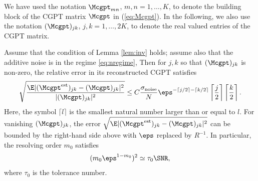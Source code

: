 We have used the notation $\Mcgpt_{mn}$, $m,n=1, \ldots, K$, to
denote the building block of the CGPT matrix $\Mcgpt$ in
(\ref{eq:Mcgpt}). In the following, we also use the notation
$(\Mcgpt)_{jk}$, $j,k=1, \ldots, 2K$, to denote the real valued
entries of the CGPT matrix.

\begin{theorem} Assume that the condition of Lemma \ref{lem:inv} holds; assume also that the additive noise is in the regime \eqref{eq:nregime}, Then for $j,k$ so that $(\Mcgpt)_{jk}$ is non-zero, the relative error in its reconstructed CGPT satisfies
\begin{equation}
\sqrt{\frac{\E |(\Mcgpt^{\mathrm{est}})_{jk} -
(\Mcgpt)_{jk}|^2}{|(\Mcgpt)_{jk}|^2}} \le C
\frac{\sigma_{\mathrm{noise}}}{N} \eps^{-\lceil j/2 \rceil -
\lceil k/2 \rceil} \left\lceil \frac{j}{2} \right\rceil
\left\lceil \frac{k}{2} \right\rceil. \label{eq:rerrM}
\end{equation}
Here, the symbol $\lceil l \rceil$ is the smallest natural number
larger than or equal to $l$. For vanishing $(\Mcgpt)_{jk}$, the
error $\sqrt{\E  |(\Mcgpt^{\mathrm{est}})_{jk} -
(\Mcgpt)_{jk}|^2}$ can be bounded by the right-hand side above
with $\eps$ replaced by $R^{-1}$. In particular, the resolving
order $m_0$ satisfies
\begin{equation}
(m_0 \eps^{1-m_0})^2 \simeq \tau_0 \SNR, \label{eq:snrest}
\end{equation}
where $\tau_0$ is the tolerance number.
\end{theorem}

